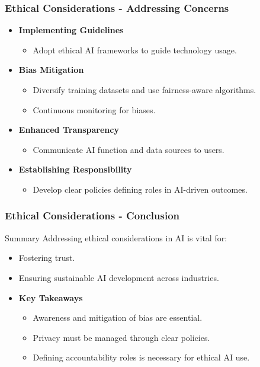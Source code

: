 \documentclass{beamer}
\begin{document}
\begin{frame}[fragile]
    \frametitle{Ethical Considerations - Addressing Concerns}
    \begin{itemize}
        \item \textbf{Implementing Guidelines}
            \begin{itemize}
                \item Adopt ethical AI frameworks to guide technology usage.
            \end{itemize}
        
        \item \textbf{Bias Mitigation}
            \begin{itemize}
                \item Diversify training datasets and use fairness-aware algorithms.
                \item Continuous monitoring for biases.
            \end{itemize}
        
        \item \textbf{Enhanced Transparency}
            \begin{itemize}
                \item Communicate AI function and data sources to users.
            \end{itemize}
        
        \item \textbf{Establishing Responsibility}
            \begin{itemize}
                \item Develop clear policies defining roles in AI-driven outcomes.
            \end{itemize}
    \end{itemize}
\end{frame}

\begin{frame}[fragile]
    \frametitle{Ethical Considerations - Conclusion}
    \begin{block}{Summary}
        Addressing ethical considerations in AI is vital for:
        \begin{itemize}
            \item Fostering trust.
            \item Ensuring sustainable AI development across industries.
        \end{itemize}
    \end{block}
    \begin{itemize}
        \item \textbf{Key Takeaways}
            \begin{itemize}
                \item Awareness and mitigation of bias are essential.
                \item Privacy must be managed through clear policies.
                \item Defining accountability roles is necessary for ethical AI use.
            \end{itemize}
    \end{itemize}
\end{frame}
\end{document}

